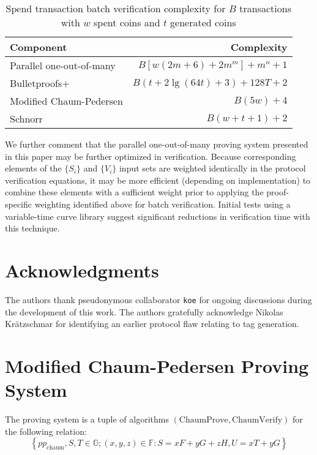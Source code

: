 \documentclass{llncs}
\newcommand{\G}{\mathbb{G}}
\newcommand{\F}{\mathbb{F}}
\begin{document}
\begin{table}
    \caption{$\text{Spend}$ transaction batch verification complexity for $B$ transactions with $w$ spent coins and $t$ generated coins}
    \label{table:time}
    \centering
    \begin{tabular}{|l|r|}
        \hline
        \textbf{Component} & \textbf{Complexity} \\
        \hline
        Parallel one-out-of-many & $B[w(2m + 6) + 2m^m] + m^n + 1$ \\
        Bulletproofs+ & $B(t + 2\lg(64t) + 3) + 128T + 2$ \\
        Modified Chaum-Pedersen & $B(5w) + 4$ \\
        Schnorr & $B(w + t + 1) + 2$ \\
        \hline
    \end{tabular}
\end{table}

We further comment that the parallel one-out-of-many proving system presented in this paper may be further optimized in verification.
Because corresponding elements of the $\{S_i\}$ and $\{V_i\}$ input sets are weighted identically in the protocol verification equations, it may be more efficient (depending on implementation) to combine these elements with a sufficient weight prior to applying the proof-specific weighting identified above for batch verification.
Initial tests using a variable-time curve library suggest significant reductions in verification time with this technique.


\section*{Acknowledgments}

The authors thank pseudonymous collaborator \texttt{koe} for ongoing discussions during the development of this work.
The authors gratefully acknowledge Nikolas Kr\"{a}tzschmar for identifying an earlier protocol flaw relating to tag generation.





\appendix


\section{Modified Chaum-Pedersen Proving System}
\label{app:chaum}

The proving system is a tuple of algorithms $(\text{ChaumProve},\text{ChaumVerify})$ for the following relation:
$$\left\{ pp_{\text{chaum}}, S, T \in \G ; (x, y, z) \in \F : S = xF + yG + zH, U = xT + yG \right\}$$
\end{document}
